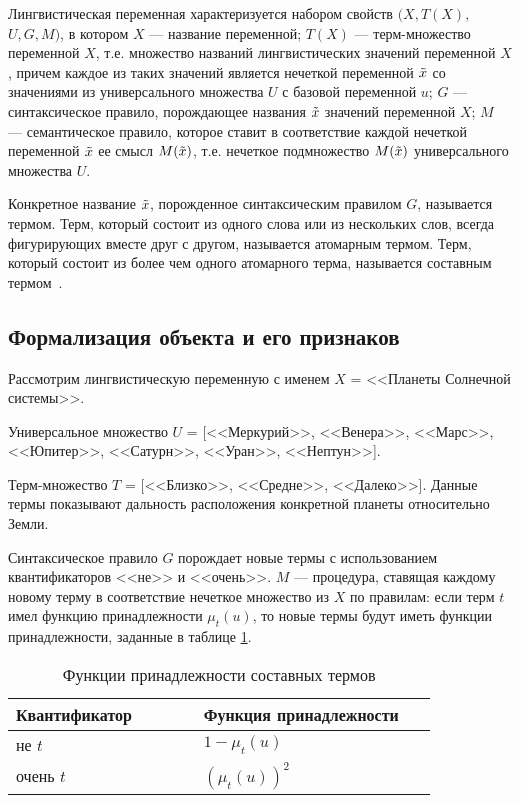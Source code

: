 Лингвистическая переменная характеризуется набором свойств $(X, T(X),$ $U, G, M)$, в котором
$X$ --- название переменной; 
$T(X)$ --- терм-множество переменной $X$, т.е. множество названий лингвистических значений переменной $X$, причем каждое из таких значений является нечеткой переменной $\Tilde{x}$ со значениями из универсального множества $U$ с базовой переменной $u$; 
$G$ --- синтаксическое правило, порождающее названия $\Tilde{x}$ значений переменной $X$; 
$M$ --- семантическое правило, которое ставит в соответствие каждой нечеткой переменной $\Tilde{x}$ ее смысл $M(\Tilde{x})$, т.е. нечеткое подмножество $M(\Tilde{x})$ универсального множества $U$.

Конкретное название $\Tilde{x}$, порожденное синтаксическим правилом $G$, называется термом. 
Терм, который состоит из одного слова или из нескольких слов, всегда фигурирующих вместе друг с другом, называется атомарным термом. 
Терм, который состоит из более чем одного атомарного терма, называется составным термом~\cite{ling1}.

\vspace{\baselineskip}
\subsection{Формализация объекта и его признаков} 
\vspace{\baselineskip}

Рассмотрим лингвистическую переменную с именем $X$ = <<Планеты Солнечной системы>>. 

Универсальное множество $U$ = [<<Меркурий>>, <<Венера>>, <<Марс>>, <<Юпитер>>, <<Сатурн>>, <<Уран>>, <<Нептун>>].

Терм-множество $T$ = [<<Близко>>, <<Средне>>, <<Далеко>>]. 
Данные термы показывают дальность расположения конкретной планеты относительно Земли.

Синтаксическое правило $G$ порождает новые термы с использованием квантификаторов <<не>> и <<очень>>.
\clearpage
$M$ --- процедура, ставящая каждому новому терму в соответствие нечеткое множество из $X$ по правилам: если терм $t$ имел функцию принадлежности $\mu_t(u)$, то новые термы будут иметь функции принадлежности, заданные в таблице \ref{tabular:terms}.

\begin{table}[h!]
	\begin{center}
	    \begin{threeparttable}
	    \captionsetup{justification=raggedright, singlelinecheck=off}
	    \caption{\label{tabular:terms} Функции принадлежности составных термов}
		\begin{tabular}{|>{\centering}p{0.4\linewidth}|p{0.5\linewidth}<{\centering}|}
			\hline
			Квантификатор & Функция принадлежности \tabularnewline 
                \hline
                не $t$ & $1 - \mu_t(u)$ \\
                \hline
                очень $t$ & $(\mu_t(u))^2$ \\
                \hline
		\end{tabular}
		\end{threeparttable}
	\end{center}
\end{table}

